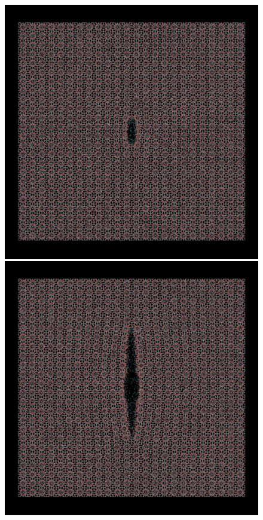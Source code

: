 \begin{figure}
\begin{minipage}[b]{0.5\linewidth}
\includegraphics[width=\textwidth]{../snapshots/c_2.pdf}
\end{minipage}
\begin{minipage}[b]{0.5\linewidth}
\includegraphics[width=\textwidth]{../snapshots/c_3.pdf}

\end{minipage}
\end{figure}
